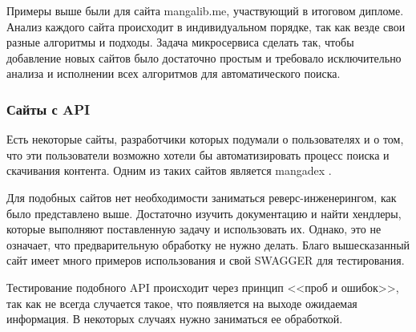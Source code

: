 Примеры выше были для сайта mangalib.me, участвующий в итоговом дипломе.
Анализ каждого сайта происходит в индивидуальном порядке, так как везде свои разные алгоритмы и подходы.
Задача микросервиса сделать так, чтобы добавление новых сайтов было достаточно простым и требовало исключительно анализа и исполнении всех алгоритмов для автоматического поиска.


\subsubsection{Сайты с API}
Есть некоторые сайты, разработчики которых подумали о пользователях и о том, что эти пользователи возможно хотели бы автоматизировать процесс поиска и скачивания контента.
Одним из таких сайтов является mangadex \cite{mangadex-cite}.

Для подобных сайтов нет необходимости заниматься реверс-инженерингом, как было представлено выше. 
Достаточно изучить документацию \cite{mangadex-api-cite} и найти хендлеры, которые выполняют поставленную задачу и использовать их.
Однако, это не означает, что предварительную обработку не нужно делать.
Благо вышесказанный сайт имеет много примеров использования и свой SWAGGER \cite{swagger-cite} для тестирования.

Тестирование подобного API происходит через принцип <<проб и ошибок>>, так как не всегда случается такое, что появляется на выходе ожидаемая информация.
В некоторых случаях нужно заниматься ее обработкой.